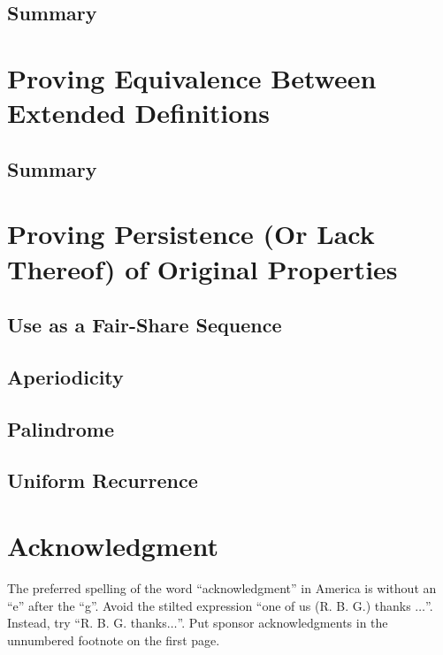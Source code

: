 \documentclass[conference]{IEEEtran}
\begin{document}
\subsection{Summary}

\section{Proving Equivalence Between Extended Definitions}

\subsection{Summary}

\section{Proving Persistence (Or Lack Thereof) of Original Properties}

\subsection{Use as a Fair-Share Sequence}

\subsection{Aperiodicity}

\subsection{Palindrome}

\subsection{Uniform Recurrence}


\section{Acknowledgment}

The preferred spelling of the word ``acknowledgment'' in America is without 
an ``e'' after the ``g''. Avoid the stilted expression ``one of us (R. B. 
G.) thanks $\ldots$''. Instead, try ``R. B. G. thanks$\ldots$''. Put sponsor 
acknowledgments in the unnumbered footnote on the first page.
\end{document}
